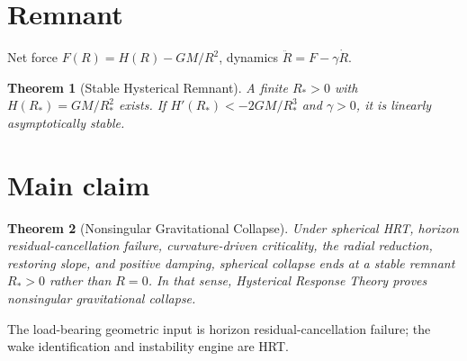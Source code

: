 \documentclass[11pt]{article}
\newtheorem{theorem}{Theorem}[section]
\theoremstyle{definition}
\theoremstyle{remark}
\newcommand{\GM}{GM}
\begin{document}
\section{Remnant}
Net force $F(R)=H(R)-\GM/R^{2}$, dynamics $\ddot R=F-\gamma\dot R$.

\begin{theorem}[Stable Hysterical Remnant]
A finite $R_\ast>0$ with $H(R_\ast)=\GM/R_\ast^{2}$ exists.
If $H'(R_\ast)<-2\GM/R_\ast^{3}$ and $\gamma>0$, it is linearly asymptotically stable.
\end{theorem}

\section{Main claim}
\begin{theorem}[Nonsingular Gravitational Collapse]
Under spherical HRT, horizon residual-cancellation failure, curvature-driven
criticality, the radial reduction, restoring slope, and positive damping, spherical
collapse ends at a stable remnant $R_\ast>0$ rather than $R=0$.
In that sense, Hysterical Response Theory proves nonsingular gravitational collapse.
\end{theorem}

The load-bearing geometric input is horizon residual-cancellation failure; the wake
identification and instability engine are HRT.
\end{document}
